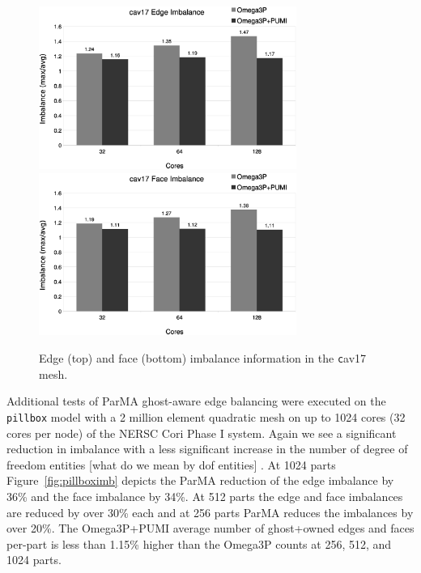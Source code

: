 \documentclass[review,12pt]{elsarticle_summary_report}
\begin{document}
\begin{figure}[!ph]
\centering
  \includegraphics[width=0.75\textwidth]{cav17-edge-imb.eps} \\
  \includegraphics[width=0.75\textwidth]{cav17-face-imb.eps} 
  \caption{\label{fig:cav17imb} Edge (top) and face (bottom) imbalance information in the {\texttt cav17} mesh.}
\end{figure}

Additional tests of ParMA ghost-aware edge balancing were executed on the
\texttt{pillbox} model with a 2 million element quadratic mesh on up to 1024
cores (32 cores per node) of the NERSC Cori Phase I system.
Again we see a significant reduction in imbalance with a less significant increase in the number of degree of freedom entities \color{red} [what do we mean by dof entities] \color{black}.
At 1024 parts Figure~\ref{fig:pillboximb} depicts the ParMA reduction of the
edge imbalance by 36\% and the face imbalance by 34\%.
At 512 parts the edge and face imbalances are reduced by over 30\% each and
at 256 parts ParMA reduces the imbalances by over 20\%.
The Omega3P+PUMI average number of ghost+owned edges and faces per-part
is less than 1.15\% higher than the Omega3P counts at 256, 512, and 1024 parts.
\end{document}
